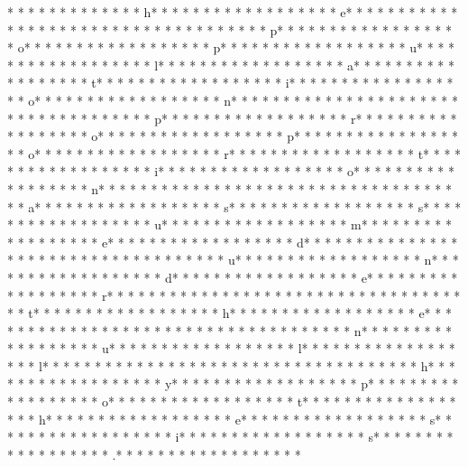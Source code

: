 *  * * *  *  * * *  *  * * *  * h* * *  * * *  * * *  *  * * *  *  * * *  * e* * *  * * *  * * *  *  * * *  *  * * *  *  * * *  * * *  * * *  *  * * *  *  * * *  * p* * *  * * *  * * *  *  * * *  *  * * *  * o* * *  * * *  * * *  *  * * *  *  * * *  * p* * *  * * *  * * *  *  * * *  *  * * *  * u* * *  * * *  * * *  *  * * *  *  * * *  * l* * *  * * *  * * *  *  * * *  *  * * *  * a* * *  * * *  * * *  *  * * *  *  * * *  * t* * *  * * *  * * *  *  * * *  *  * * *  * i* * *  * * *  * * *  *  * * *  *  * * *  * o* * *  * * *  * * *  *  * * *  *  * * *  * n* * *  * * *  * * *  *  * * *  *  * * *  *  * * *  * * *  * * *  *  * * *  *  * * *  * p* * *  * * *  * * *  *  * * *  *  * * *  * r* * *  * * *  * * *  *  * * *  *  * * *  * o* * *  * * *  * * *  *  * * *  *  * * *  * p* * *  * * *  * * *  *  * * *  *  * * *  * o* * *  * * *  * * *  *  * * *  *  * * *  * r* * *  * * *  * * *  *  * * *  *  * * *  * t* * *  * * *  * * *  *  * * *  *  * * *  * i* * *  * * *  * * *  *  * * *  *  * * *  * o* * *  * * *  * * *  *  * * *  *  * * *  * n* * *  * * *  * * *  *  * * *  *  * * *  *  * * *  * * *  * * *  *  * * *  *  * * *  * a* * *  * * *  * * *  *  * * *  *  * * *  * s* * *  * * *  * * *  *  * * *  *  * * *  * s* * *  * * *  * * *  *  * * *  *  * * *  * u* * *  * * *  * * *  *  * * *  *  * * *  * m* * *  * * *  * * *  *  * * *  *  * * *  * e* * *  * * *  * * *  *  * * *  *  * * *  * d* * *  * * *  * * *  *  * * *  *  * * *  *  * * *  * * *  * * *  *  * * *  *  * * *  * u* * *  * * *  * * *  *  * * *  *  * * *  * n* * *  * * *  * * *  *  * * *  *  * * *  * d* * *  * * *  * * *  *  * * *  *  * * *  * e* * *  * * *  * * *  *  * * *  *  * * *  * r* * *  * * *  * * *  *  * * *  *  * * *  *  * * *  * * *  * * *  *  * * *  *  * * *  * t* * *  * * *  * * *  *  * * *  *  * * *  * h* * *  * * *  * * *  *  * * *  *  * * *  * e* * *  * * *  * * *  *  * * *  *  * * *  *  * * *  * * *  * * *  *  * * *  *  * * *  * n* * *  * * *  * * *  *  * * *  *  * * *  * u* * *  * * *  * * *  *  * * *  *  * * *  * l* * *  * * *  * * *  *  * * *  *  * * *  * l* * *  * * *  * * *  *  * * *  *  * * *  *  * * *  * * *  * * *  *  * * *  *  * * *  * h* * *  * * *  * * *  *  * * *  *  * * *  * y* * *  * * *  * * *  *  * * *  *  * * *  * p* * *  * * *  * * *  *  * * *  *  * * *  * o* * *  * * *  * * *  *  * * *  *  * * *  * t* * *  * * *  * * *  *  * * *  *  * * *  * h* * *  * * *  * * *  *  * * *  *  * * *  * e* * *  * * *  * * *  *  * * *  *  * * *  * s* * *  * * *  * * *  *  * * *  *  * * *  * i* * *  * * *  * * *  *  * * *  *  * * *  * s* * *  * * *  * * *  *  * * *  *  * * *  * .* * *  * * *  * * *  *  * * *  *  * * *  * 
